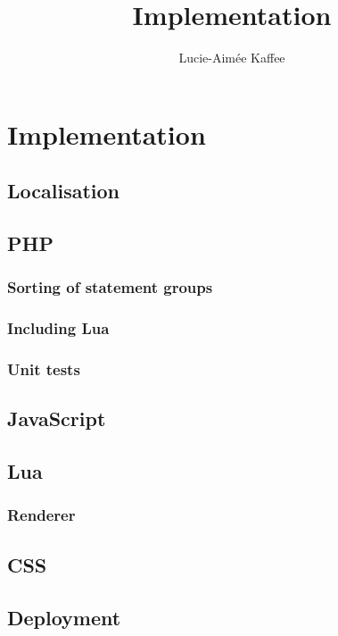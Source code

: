 \documentclass[11pt]{article}
\title {{Implementation}}
\author {Lucie-Aim\'{e}e Kaffee}
\date{}
\begin{document}
	\linenumbers
	\section{Implementation}
	\subsection{Localisation}
	\subsection{PHP}
	
	\newpage
	
	\newpage
	\subsubsection{Sorting of statement groups}
	\subsubsection{Including Lua}
	\subsubsection{Unit tests}
	\subsection{JavaScript}
	\subsection{Lua}
	\subsubsection{Renderer}
	
	\newpage
	\subsection{CSS}
	\subsection{Deployment}
	
\end{document}
